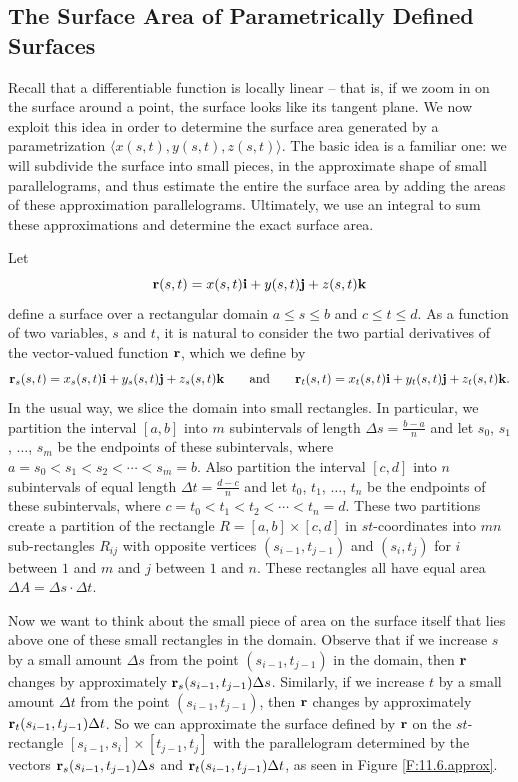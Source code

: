 


%

\subsection*{The Surface Area of Parametrically Defined Surfaces}

Recall that a differentiable function is locally linear -- that is, if we zoom in on the surface around a point, the surface looks like its tangent plane. We now exploit this idea in order to determine the surface area generated by a parametrization $\langle x(s,t), y(s,t), z(s,t) \rangle$.  The basic idea is a familiar one:  we will subdivide the surface into small pieces, in the approximate shape of small parallelograms, and thus estimate the entire the surface area by adding the areas of these approximation parallelograms. Ultimately, we use an integral to sum these approximations and determine the exact surface area.

Let
\[\mathbf{r}(s,t) = x(s,t) \mathbf{i} + y(s,t) \mathbf{j} + z(s,t) \mathbf{k}\]
define a surface over a rectangular domain $a \leq s \leq b$ and $c \leq t \leq d$. As a function of two variables, $s$ and $t$, it is natural to consider the two partial derivatives of the vector-valued function $\mathbf{r}$, which we define by
\[\mathbf{r}_s(s,t) = x_s(s,t) \mathbf{i} + y_s(s,t) \mathbf{j} + z_s(s,t) \mathbf{k} \ \ \ \ \ \text{ and } \ \ \ \ \ \mathbf{r}_t(s,t) = x_t(s,t) \mathbf{i} + y_t(s,t) \mathbf{j} + z_t(s,t) \mathbf{k}.\]
In the usual way,  we slice the domain into small rectangles.  In particular, we partition the interval $[a,b]$ into $m$ subintervals of length $\Delta s = \frac{b-a}{n}$ and let $s_0$, $s_1$, $\ldots$, $s_m$ be the endpoints of these subintervals, where $a = s_0<s_1<s_2 < \cdots < s_m = b$. Also partition the interval $[c,d]$ into $n$ subintervals of equal length $\Delta t = \frac{d-c}{n}$ and let $t_0$, $t_1$, $\ldots$, $t_n$ be the endpoints of these subintervals, where $c = t_0<t_1<t_2 < \cdots < t_n = d$. These two partitions create a partition of the rectangle $R = [a,b] \times [c,d]$ in $st$-coordinates into $mn$ sub-rectangles $R_{ij}$ with opposite vertices $(s_{i-1},t_{j-1})$ and $(s_i, t_j)$ for $i$ between $1$ and $m$ and $j$ between $1$ and $n$. These rectangles all have equal area $\Delta A = \Delta s \cdot \Delta t$.

Now we want to think about the small piece of area on the surface itself that lies above one of these small rectangles in the domain.
Observe that if we increase $s$ by a small amount $\Delta s$ from the point
$(s_{i-1},t_{j-1})$ in the domain, then $\mathbf{r}$ changes by approximately
$\mathbf{r}_s(s_{i-1},t_{j-1}) \Delta s$. Similarly, if we increase $t$ by a
small amount $\Delta t$ from the point $(s_{i-1},t_{j-1})$, then $\mathbf{r}$
changes by approximately $\mathbf{r}_t(s_{i-1},t_{j-1}) \Delta t$. So we can
approximate the surface defined by $\mathbf{r}$ on the $st$-rectangle
$[s_{i-1},s_i] \times [t_{j-1}, t_{j}]$ with the
parallelogram determined by the vectors $\mathbf{r}_s(s_{i-1},t_{j-1}) \Delta
s$ and $\mathbf{r}_t(s_{i-1},t_{j-1}) \Delta t$, as seen in Figure
\ref{F:11.6.approx}. 


